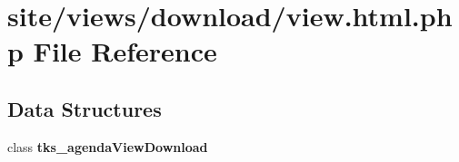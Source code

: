 \section{site/views/download/view.html.\+php File Reference}
\label{site_2views_2download_2view_8html_8php}
\subsection*{Data Structures}
\begin{DoxyCompactItemize}
\item 
class \textbf{ tks\+\_\+agenda\+View\+Download}
\end{DoxyCompactItemize}
